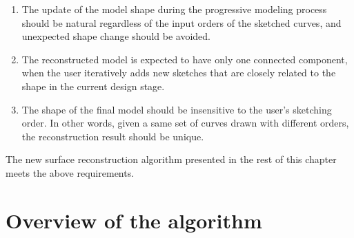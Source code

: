 \begin{enumerate}
    \item The update of the model shape during the progressive modeling process should be
natural regardless of the input orders of the sketched curves, and
unexpected shape change should be avoided.
    \label{req:1}
    \item The reconstructed model is expected to have only one connected component,
when the user iteratively adds new sketches that are closely related
to the shape in the current design stage.
    \label{req:2}
    \item The shape of the final model should be insensitive to the user's
sketching order. In other words, given a same set of curves drawn
with different orders, the reconstruction result should be unique.
    \label{req:3}
\end{enumerate}

The new surface reconstruction algorithm presented in the rest of
this chapter meets the above requirements.

\section{Overview of the algorithm}
%
\label{ch4:sec:algo:ov}

